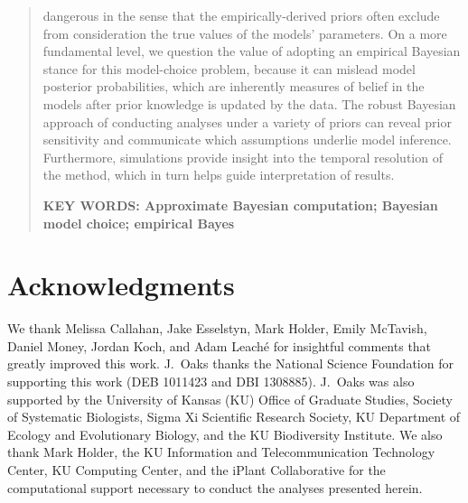 \documentclass[letterpaper,12pt]{article}
\begin{document}
\begin{abstract}
    dangerous in the sense that the empirically-derived priors often
    exclude from consideration the true values of the models' parameters.
    On a more fundamental level, we question the value of adopting an empirical
    Bayesian stance for this model-choice problem, because it can mislead model
    posterior probabilities, which are inherently measures of belief in the
    models after prior knowledge is updated by the data.
    The robust Bayesian approach of conducting analyses under a variety
    of priors can reveal prior sensitivity and communicate which assumptions
    underlie model inference.
    Furthermore, simulations provide insight into the temporal resolution of
    the method, which in turn helps guide interpretation of results.

    \vspace{12pt}
    \noindent\textbf{KEY WORDS: Approximate Bayesian computation; Bayesian
        model choice; empirical Bayes} 
\end{abstract}

\newpage



\section{Acknowledgments}
We thank Melissa Callahan, Jake Esselstyn, Mark Holder, Emily McTavish, Daniel
Money, Jordan Koch, and Adam Leach\'{e} for insightful comments that greatly
improved this work.
J.\ Oaks thanks the National Science Foundation for supporting this work (DEB
1011423 and DBI 1308885).
J.\ Oaks was also supported by the University of Kansas (KU) Office of Graduate
Studies, Society of Systematic Biologists, Sigma Xi Scientific Research
Society, KU Department of Ecology and Evolutionary Biology, and the KU
Biodiversity Institute.
We also thank Mark Holder, the KU Information and Telecommunication Technology
Center, KU Computing Center, and the iPlant Collaborative for the computational
support necessary to conduct the analyses presented herein.



\newpage
\singlespacing

\renewcommand\listfigurename{Figure Captions}
\renewcommand\cftdotsep{\cftnodots}
\setlength\cftbeforefigskip{10pt}
\listoffigures


\end{document}
